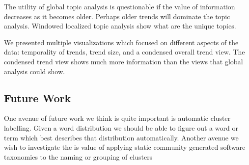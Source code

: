 \documentclass[times, 10pt,twocolumn]{article}
\begin{document}
The utility of global topic analysis is questionable if the value of
information decreases as it becomes older. Perhaps older trends will
dominate the topic analysis. Windowed localized topic analysis show
what are the unique topics.

We presented multiple visualizations which focused on different
aspects of the data: temporality of trends, trend size, and a
condensed overall trend view. The condensed trend view shows much more
information than the views that global analysis could show.


\subsection{ Future Work}

One avenue of future work we think is quite important is automatic
cluster labelling. Given a word distribution we should be able to
figure out a word or term which best describes that distribution
automatically.
Another avenue we wish to investigate the is value of applying
static community generated software taxonomies to the naming or
grouping of clusters







%


\end{document}
